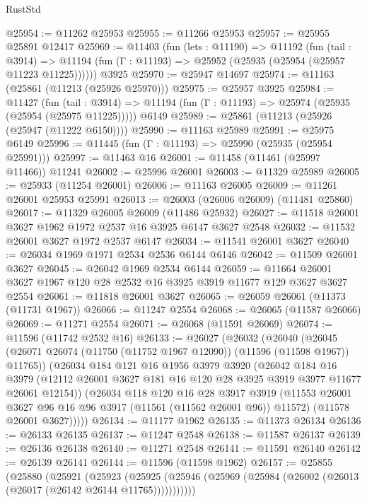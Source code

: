 \begin{lexlean}{RustStd}
\begin{coremodule}
@25954 := @11262 @25953
@25955 := @11266 @25953
@25957 := @25955 @25891 @12417
@25969 := @11403
    (fun (lets : @11190) =>
    @11192
      (fun (tail : @3914) =>
      @11194 (fun (Γ : @11193) => @25952 (@25935 (@25954 (@25957 @11223 @11225))))))
    @3925
@25970 := @25947 @14697
@25974 := @11163 (@25861 (@11213 (@25926 @25970)))
@25975 := @25957 @3925
@25984 := @11427
    (fun (tail : @3914) => @11194 (fun (Γ : @11193) => @25974 (@25935 (@25954 (@25975 @11225)))))
    @6149
@25989 := @25861 (@11213 (@25926 (@25947 (@11222 @6150))))
@25990 := @11163 @25989
@25991 := @25975 @6149
@25996 := @11445 (fun (Γ : @11193) => @25990 (@25935 (@25954 @25991)))
@25997 := @11463 @16
@26001 := @11458 (@11461 (@25997 @11466)) @11241
@26002 := @25996 @26001
@26003 := @11329 @25989
@26005 := @25933 (@11254 @26001)
@26006 := @11163 @26005
@26009 := @11261 @26001 @25953 @25991
@26013 := @26003 (@26006 @26009) (@11481 @25860)
@26017 := @11329 @26005 @26009 (@11486 @25932)
@26027 := @11518 @26001 @3627 @1962 @1972 @2537 @16 @3925 @6147 @3627 @2548
@26032 := @11532 @26001 @3627 @1972 @2537 @6147
@26034 := @11541 @26001 @3627
@26040 := @26034 @1969 @1971 @2534 @2536 @6144 @6146
@26042 := @11509 @26001 @3627
@26045 := @26042 @1969 @2534 @6144
@26059 := @11664 @26001 @3627 @1967 @120 @28 @2532 @16 @3925 @3919 @11677 @129 @3627 @3627 @2554
@26061 := @11818 @26001 @3627
@26065 := @26059 @26061 (@11373 (@11731 @1967))
@26066 := @11247 @2554
@26068 := @26065 (@11587 @26066)
@26069 := @11271 @2554
@26071 := @26068 (@11591 @26069)
@26074 := @11596 (@11742 @2532 @16)
@26133 := @26027
    (@26032
      (@26040
        (@26045 (@26071 @26074 (@11750 (@11752 @1967 @12090)) (@11596 (@11598 @1967)) @11765))
        (@26034
          @184
          @121
          @16
          @1956
          @3979
          @3920
          (@26042
            @184
            @16
            @3979
            (@12112 @26001 @3627 @181 @16 @120 @28 @3925 @3919 @3977 @11677 @26061 @12154))
          (@26034
            @118
            @120
            @16
            @28
            @3917
            @3919
            (@11553 @26001 @3627 @96 @16 @96 @3917 (@11561 (@11562 @26001 @96)) @11572)
            (@11578 @26001 @3627)))))
@26134 := @11177 @1962
@26135 := @11373 @26134
@26136 := @26133 @26135
@26137 := @11247 @2548
@26138 := @11587 @26137
@26139 := @26136 @26138
@26140 := @11271 @2548
@26141 := @11591 @26140
@26142 := @26139 @26141
@26144 := @11596 (@11598 @1962)
@26157 := @25855
    (@25880
      (@25921
        (@25923
          (@25925 (@25946 (@25969 (@25984 (@26002 (@26013 (@26017 (@26142 @26144 @11765)))))))))))

\end{coremodule}
\end{lexlean}
